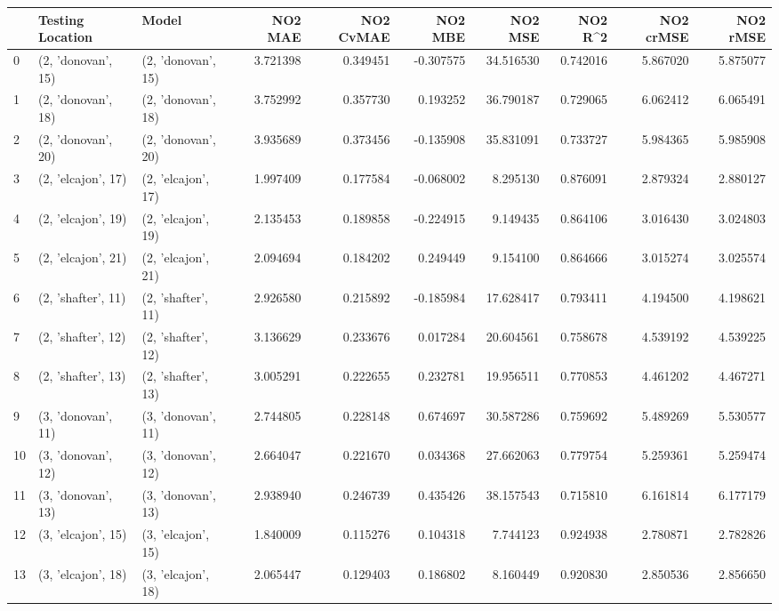 \begin{tabular}{lllrrrrrrr}
\toprule
{} &    Testing Location &               Model &   NO2 MAE &  NO2 CvMAE &   NO2 MBE &    NO2 MSE &   NO2 R\textasciicircum2 &  NO2 crMSE &  NO2 rMSE \\
\midrule
0  &  (2, 'donovan', 15) &  (2, 'donovan', 15) &  3.721398 &   0.349451 & -0.307575 &  34.516530 &  0.742016 &   5.867020 &  5.875077 \\
1  &  (2, 'donovan', 18) &  (2, 'donovan', 18) &  3.752992 &   0.357730 &  0.193252 &  36.790187 &  0.729065 &   6.062412 &  6.065491 \\
2  &  (2, 'donovan', 20) &  (2, 'donovan', 20) &  3.935689 &   0.373456 & -0.135908 &  35.831091 &  0.733727 &   5.984365 &  5.985908 \\
3  &  (2, 'elcajon', 17) &  (2, 'elcajon', 17) &  1.997409 &   0.177584 & -0.068002 &   8.295130 &  0.876091 &   2.879324 &  2.880127 \\
4  &  (2, 'elcajon', 19) &  (2, 'elcajon', 19) &  2.135453 &   0.189858 & -0.224915 &   9.149435 &  0.864106 &   3.016430 &  3.024803 \\
5  &  (2, 'elcajon', 21) &  (2, 'elcajon', 21) &  2.094694 &   0.184202 &  0.249449 &   9.154100 &  0.864666 &   3.015274 &  3.025574 \\
6  &  (2, 'shafter', 11) &  (2, 'shafter', 11) &  2.926580 &   0.215892 & -0.185984 &  17.628417 &  0.793411 &   4.194500 &  4.198621 \\
7  &  (2, 'shafter', 12) &  (2, 'shafter', 12) &  3.136629 &   0.233676 &  0.017284 &  20.604561 &  0.758678 &   4.539192 &  4.539225 \\
8  &  (2, 'shafter', 13) &  (2, 'shafter', 13) &  3.005291 &   0.222655 &  0.232781 &  19.956511 &  0.770853 &   4.461202 &  4.467271 \\
9  &  (3, 'donovan', 11) &  (3, 'donovan', 11) &  2.744805 &   0.228148 &  0.674697 &  30.587286 &  0.759692 &   5.489269 &  5.530577 \\
10 &  (3, 'donovan', 12) &  (3, 'donovan', 12) &  2.664047 &   0.221670 &  0.034368 &  27.662063 &  0.779754 &   5.259361 &  5.259474 \\
11 &  (3, 'donovan', 13) &  (3, 'donovan', 13) &  2.938940 &   0.246739 &  0.435426 &  38.157543 &  0.715810 &   6.161814 &  6.177179 \\
12 &  (3, 'elcajon', 15) &  (3, 'elcajon', 15) &  1.840009 &   0.115276 &  0.104318 &   7.744123 &  0.924938 &   2.780871 &  2.782826 \\
13 &  (3, 'elcajon', 18) &  (3, 'elcajon', 18) &  2.065447 &   0.129403 &  0.186802 &   8.160449 &  0.920830 &   2.850536 &  2.856650 \\

\end{tabular}
